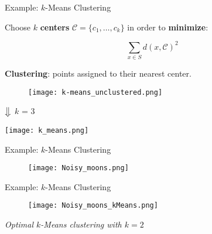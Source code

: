 \documentclass[aspectratio=169]{beamer}
\begin{document}
\begin{frame}{Example: $k$-Means Clustering}

\begin{minipage}[c]{0.60\textwidth}
    Choose $k$ \textbf{centers} $\mathcal{C}=\{c_1,\dots,c_k\}$ in order to \textbf{minimize}:
   
    \[
        \sum_{x\in S} d(x,\mathcal{C})^2
    \]

    \vspace{0.3cm}
    \textbf{Clustering}: points assigned to their nearest center.
\end{minipage}
\hfill
\begin{minipage}[c]{0.35\textwidth}

    \begin{figure}
        \centering
        \texttt{[image: k-means\_unclustered.png]}
    \end{figure}
    \begin{center}
        $\big\Downarrow$ $k$ = 3
    \end{center}
    \centering \texttt{[image: k\_means.png]}

    
    
\end{minipage}

    
\end{frame}

\begin{comment}
\begin{frame}{Example: $k$-Means Clustering}
\begin{figure}
    \centering
    \texttt{[image: kMeans.png]}
    \caption{$k$-Means Clustering with $k=3$}
    \label{fig:enter-label}
\end{figure}
\end{frame}
\end{comment}

\begin{frame}{Example: $k$-Means Clustering}

    \begin{figure}
        \centering
        \texttt{[image: Noisy\_moons.png]}
    \end{figure}

\end{frame}

\begin{frame}{Example: $k$-Means Clustering}

    \begin{figure}
        \centering
        \texttt{[image: Noisy\_moons\_kMeans.png]}
    \end{figure}
    \begin{center}
        \textit{Optimal $k$-Means clustering with $k=2$}
    \end{center}
\end{frame}
\end{document}
